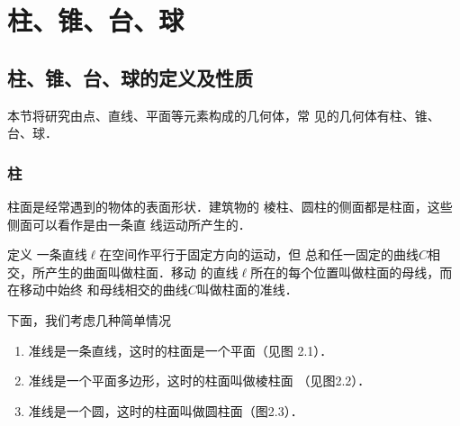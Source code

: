 \chapter{柱、锥、台、球}

\section{柱、锥、台、球的定义及性质}
本节将研究由点、直线、平面等元素构成的几何体，常
见的几何体有柱、锥、台、球．

\subsection{柱}

柱面是经常遇到的物体的表面形状．建筑物的
棱柱、圆柱的侧面都是柱面，这些侧面可以看作是由一条直
线运动所产生的．

\begin{blk}{定义}
    一条直线$\ell$在空间作平行于固定方向的运动，但
总和任一固定的曲线$C$相交，所产生的曲面叫做柱面．移动
的直线$\ell$所在的每个位置叫做柱面的母线，而在移动中始终
和母线相交的曲线$C$叫做柱面的准线．
\end{blk}

下面，我们考虑几种简单情况
\begin{enumerate}
\item 准线是一条直线，这时的柱面是一个平面（见图
2.1）．
\item 准线是一个平面多边形，这时的柱面叫做棱柱面
（见图2.2）．
\item 准线是一个圆，这时的柱面叫做圆柱面（图2.3）．
\end{enumerate}

